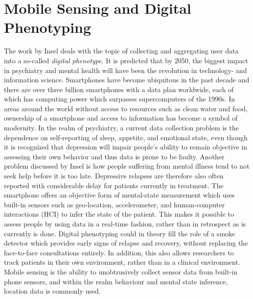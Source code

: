 \section{Mobile Sensing and Digital Phenotyping}
The work by Insel \cite{digital_phenotyping} deals with the topic of collecting and aggregating user data into a so-called \textit{digital phenotype}. It is predicted that by 2050, the biggest impact in psychiatry and mental health will have been the revolution in technology- and information science. Smartphones have become ubiquitous in the past decade and there are over three billion smartphones with a data plan worldwide, each of which has computing power which surpasses supercomputers of the 1990s. In areas around the world without access to resources such as clean water and food, ownership of a smartphone and access to information has become a symbol of modernity. In the realm of psychiatry, a current data collection problem is the dependence on self-reporting of sleep, appetite, and emotional state, even though it is recognized that depression will impair people's ability to remain objective in assessing their own behavior and thus data is prone to be faulty. Another problem discussed by Insel is how people suffering from mental illness tend to not seek help before it is too late. Depressive relapses are therefore also often reported with considerable delay for patients currently in treatment. The smartphone offers an objective form of mental-state measurement which uses built-in sensors such as geo-location, accelerometer, and human-computer interactions (HCI) to infer the state of the patient. This makes it possible to assess people by using data in a real-time fashion, rather than in retrospect as is currently is done. Digital phenotyping could in theory fill the role of a smoke detector which provides early signs of relapse and recovery, without replacing the face-to-face consultations entirely. In addition, this also allows researchers to track patients in their own environment, rather than in a clinical environment. Mobile sensing is the ability to unobtrusively collect sensor data from built-in phone sensors, and within the realm behaviour and mental state inference, location data is commonly used. 